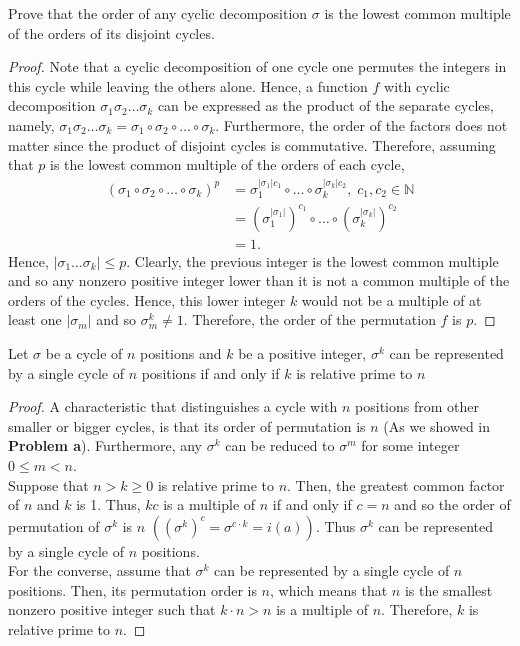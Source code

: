 \documentclass[12pt]{article}
\newcommand{\N}{\mathbb{N}}
\newenvironment{problem}[2][Problem]{\begin{trivlist} \item[\hskip \labelsep {\bfseries #1}\hskip \labelsep {\bfseries #2.}]}{\end{trivlist}}
\begin{document}
\begin{problem}{b}
  Prove that the order of any cyclic decomposition $\sigma$ is the lowest common multiple of the orders of its disjoint cycles. 
\begin{proof}
  Note that a cyclic decomposition of one cycle one permutes the integers in this cycle while leaving the others alone. Hence, a function $f$ with cyclic decomposition $\sigma_{1}\sigma_{2}\dots\sigma_{k}$ can be expressed as the product of the separate cycles, namely, $\sigma_{1}\sigma_{2}\dots\sigma_{k} = \sigma_{1}\circ\sigma_{2}\circ\dots\circ\sigma_{k}$. Furthermore, the order of the factors does not matter since the product of disjoint cycles is commutative. Therefore, assuming that $p$ is the lowest common multiple of the orders of each cycle, 
\begin{align*}
  \left(\sigma_{1}\circ\sigma_{2}\circ\dots\circ\sigma_{k}\right)^{p} &= \sigma_{1}^{|\sigma_{1}|c_{1}}\circ\dots\circ\sigma_{k}^{|\sigma_{k}|c_{2}}, \; c_{1},c_{2}\in \N\\ 
  &= \left(\sigma_{1}^{|\sigma_{1}|}\right)^{c_{1}}\circ\dots\circ\left(\sigma_{k}^{|\sigma_{k}|}\right)^{c_{2}}\\
  &= 1.
\end{align*}
Hence, $|\sigma_{1}\dots\sigma_{k}|\leq p$. Clearly, the previous integer is the lowest common multiple and so any nonzero positive integer lower than it is not a common multiple of the orders of the cycles. Hence, this lower integer $k$ would not be a multiple of at least one $|\sigma_{m}|$ and so $\sigma_{m}^{k}\neq 1$. Therefore, the order of the permutation $f$ is $p$.
\end{proof}
\end{problem}
\begin{problem}{c}
  Let $\sigma$ be a cycle of $n$ positions and $k$ be a positive integer, $\sigma^{k}$ can be represented by a single cycle of $n$ positions if and only if $k$ is relative prime to $n$
\begin{proof}
  A characteristic that distinguishes a cycle with $n$ positions from other smaller or bigger cycles, is that its order of permutation is $n$ (As we showed in \textbf{Problem a}). Furthermore, any $\sigma^{k}$ can be reduced to $\sigma^{m}$ for some integer $0\leq m<n$. \\
  Suppose that $n>k\geq 0$ is relative prime to $n$. Then, the greatest common factor of $n$ and $k$ is 1. Thus, $kc$ is a multiple of $n$ if and only if $c=n$ and so the order of permutation of $\sigma^{k}$ is $n$ $\left( \left( \sigma^{k} \right)^{c} = \sigma^{c\cdot k}=i(a) \right)$. Thus $\sigma^{k}$ can be represented by a single cycle of $n$ positions.\\
  For the converse, assume that $\sigma^{k}$ can be represented by a single cycle of $n$ positions. Then, its permutation order is $n$, which means that $n$ is the smallest nonzero positive integer such that $k\cdot n>n$ is a multiple of $n$. Therefore, $k$ is relative prime to $n$.
\end{proof}
\end{problem}
\end{document}
